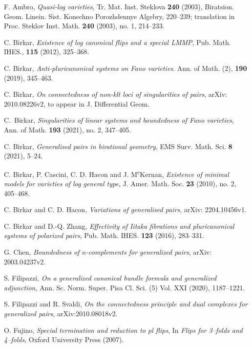 \documentclass[11pt]{amsart}
\numberwithin{equation}{section}
\theoremstyle{definition}
\theoremstyle{definition}
\theoremstyle{definition}
\begin{document}
\begin{thebibliography}{ABCDE}

 F. Ambro, \textit{Quasi-log varieties}, Tr. Mat. Inst. Steklova \textbf{240} (2003), Biratsion. Geom. Linein. Sist. Konechno Porozhdennye Algebry, 220--239; translation in Proc. Steklov Inst. Math. \textbf{240} (2003), no. 1, 214--233.

 C. Birkar, \textit{Existence of log canonical flips and a special LMMP}, Pub. Math. IHES., \textbf{115} (2012), 325--368.

 C. Birkar, \textit{Anti-pluricanonical systems on Fano varieties}. Ann. of Math. (2), \textbf{190} (2019), 345--463.

 C. Birkar, \textit{On connectedness of non-klt loci of singularities of pairs}, arXiv: 2010.08226v2, to appear in J. Differential Geom.

C.~Birkar, \textit{Singularities of linear systems and boundedness of {F}ano varieties}, Ann. of Math. \textbf{193} (2021), no. 2, 347--405.

  C. Birkar, \textit{Generalised pairs in birational geometry}, EMS Surv. Math. Sci. \textbf{8} (2021), 5--24.
	
C. Birkar, P. Cascini, C. D. Hacon and J. M\textsuperscript{c}Kernan, \textit{Existence of minimal models for varieties of log general type}, J. Amer. Math. Soc. \textbf{23} (2010), no. 2, 405--468.

 C. Birkar and C. D. Hacon, \textit{Variations of generalised pairs}, arXiv: 2204.10456v1.


 C. Birkar and D.-Q. Zhang, \textit{Effectivity of Iitaka fibrations and pluricanonical systems of polarized pairs}, Pub. Math. IHES. \textbf{123} (2016), 283--331.


 G. Chen, \textit{Boundedness of $n$-complements for generalized pairs}, arXiv: 2003.04237v2.

 S. Filipazzi, \textit{On a generalized canonical bundle formula and generalized adjunction}, Ann. Sc. Norm. Super. Pisa Cl. Sci. (5) Vol. XXI (2020), 1187--1221.

 S. Filipazzi and R. Svaldi, \textit{On the connectedness principle and dual complexes for generalized pairs}, arXiv:2010.08018v2.

 O. Fujino, \textit{Special termination and reduction to pl flips}, In \textit{Flips for 3--folds and 4--folds}, Oxford University Press (2007).


\end{thebibliography}
\end{document}

